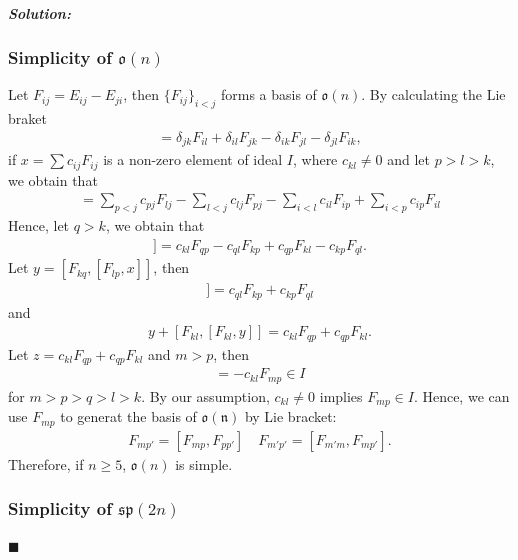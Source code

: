 \documentclass[12pt, a4paper]{article}
\newenvironment{solution}
  {\paragraph{\textit{Solution:}}\par\medskip}
  {\hfill$\blacksquare$\vspace{0.1cm}}
\begin{document}
\begin{solution}
\subsubsection*{Simplicity of $\mathfrak{o}(n)$}
Let $F_{ij} = E_{ij}-E_{ji}$, then $\{F_{ij}\}_{i<j}$ forms a basis of $\mathfrak{o}(n)$. By calculating the Lie braket 
\begin{align*}
 [F_{ij}, F_{kl}] = \delta_{jk}F_{il} + \delta_{il}F_{jk} - \delta_{ik}F_{jl} - \delta_{jl}F_{ik},
\end{align*}
if $x= \sum c_{ij}F_{ij}$ is a non-zero element of ideal $I$, where $c_{kl}\neq 0$ and let $p>l>k$, 
we obtain that 
\begin{align*}
  [F_{lp}, x] = \sum_{p<j} c_{pj}F_{lj} - \sum_{l<j} c_{lj}F_{pj} - \sum_{i<l} c_{il}F_{ip} + \sum_{i<p} c_{ip}F_{il}
\end{align*} 
Hence, let $q>k$, we obtain that
\begin{align*}
  [F_{kq}, [F_{lp}, x]] = c_{kl}F_{qp} - c_{ql}F_{kp} + c_{qp}F_{kl} - c_{kp}F_{ql}.
\end{align*}
Let $y=[F_{kq}, [F_{lp}, x]]$, then
\begin{align*}
  [F_{kl},[F_{kl},y]] = c_{ql}F_{kp} + c_{kp}F_{ql}
\end{align*}
and 
\begin{align*}
  y+[F_{kl},[F_{kl},y]]= c_{kl}F_{qp}+c_{qp}F_{kl}.
\end{align*}
Let $z = c_{kl}F_{qp}+c_{qp}F_{kl}$ and $m>p$, then 
\begin{align*}
  [F_{qm},z] = -c_{kl}F_{mp} \in I
\end{align*}
for $m>p>q>l>k$. By our assumption, $c_{kl}\neq 0$ implies $F_{mp}\in I$. Hence, we can use $F_{mp}$ to generat the basis of $\mathfrak{o(n)}$ by Lie bracket:
\begin{align*}
  F_{mp'} = [F_{mp},F_{pp'}] \quad F_{m'p'} = [F_{m'm},F_{mp'}].
\end{align*}
Therefore, if $n\ge 5$, $\mathfrak{o}(n)$ is simple.


\subsubsection*{Simplicity of $\mathfrak{sp}(2n)$}


\end{solution}
\end{document}

